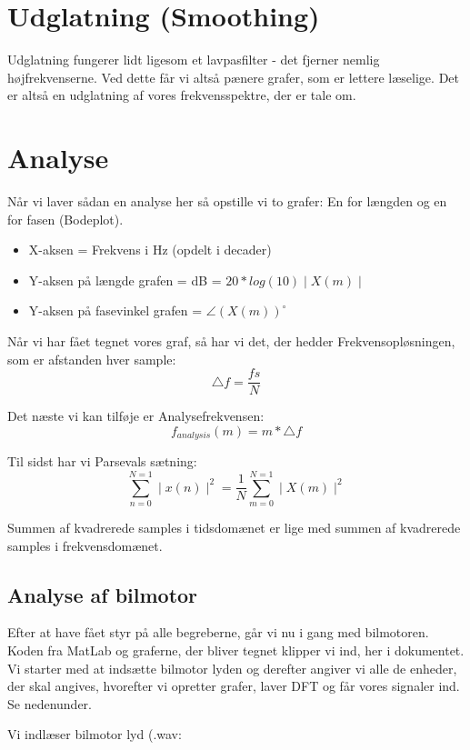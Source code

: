 \documentclass[12pt, letterpaper]{article}
\begin{document}
\section{Udglatning (Smoothing)}
Udglatning fungerer lidt ligesom et lavpasfilter - det fjerner nemlig højfrekvenserne. 
Ved dette får vi altså pænere grafer, som er lettere læselige. Det er altså en udglatning af vores frekvensspektre, der er tale om. 

\section{Analyse}

Når vi laver sådan en analyse her så opstille vi to grafer: 
En for længden og en for fasen (Bodeplot). \\

\begin{itemize}
\item X-aksen = Frekvens i Hz (opdelt i decader)
\item Y-aksen på længde grafen = dB = $ 20*log(10)\mid X(m) \mid$ 
\item Y-aksen på fasevinkel grafen = $\angle (X(m))^{\circ}  $
\end{itemize}

Når vi har fået tegnet vores graf, så har vi det, der hedder Frekvensopløsningen, som er afstanden hver sample: 
$$\bigtriangleup f = \frac{fs}{N} $$

Det næste vi kan tilføje er Analysefrekvensen: 
$$f_{analysis}(m)=m*\bigtriangleup f$$

Til sidst har vi Parsevals sætning: 
$$ \sum\limits_{n=0}^{N=1} \mid x(n) \mid^2 = \frac{1}{N} \sum\limits_{m=0}^{N=1} \mid X(m) \mid^2    $$

Summen af kvadrerede samples i tidsdomænet er lige med summen af kvadrerede samples i frekvensdomænet.


\subsection{Analyse af bilmotor}
Efter at have fået styr på alle begreberne, går vi nu i gang med bilmotoren. Koden fra MatLab og graferne, der bliver tegnet klipper vi ind, her i dokumentet. 
Vi starter med at indsætte bilmotor lyden og derefter angiver vi alle de enheder, der skal angives, hvorefter vi opretter grafer, laver DFT og får vores signaler ind. Se nedenunder. 

Vi indlæser bilmotor lyd (.wav: 
\end{document}
